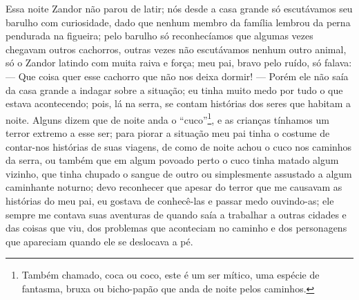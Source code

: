 Essa noite Zandor não parou de latir; nós desde a casa grande só escutávamos seu barulho com curiosidade, dado que nenhum membro da família lembrou da perna pendurada na figueira; pelo barulho só reconhecíamos que algumas vezes chegavam outros cachorros, outras vezes não escutávamos nenhum outro animal, só o Zandor latindo com muita raiva e força; meu pai, bravo pelo ruído, só falava: 
--- Que coisa quer esse cachorro que não nos deixa dormir! --- Porém ele não saía da casa grande a indagar sobre a situação; eu tinha muito medo por tudo o que estava acontecendo; pois, lá na serra, se contam histórias dos seres que habitam a noite. 
Alguns dizem que de noite anda o ``cuco''\footnote{Também chamado, coca ou coco, este é um ser mítico, uma espécie de fantasma, bruxa ou bicho-papão que anda de noite pelos caminhos.}, e as crianças tínhamos um terror extremo a esse ser; para piorar a situação meu pai tinha o costume de contar-nos histórias de suas viagens, de como de noite achou o cuco nos caminhos da serra, ou também que em algum povoado perto o cuco tinha matado algum vizinho, que tinha chupado o sangue de outro ou simplesmente assustado a algum caminhante noturno; devo reconhecer que apesar do terror que me causavam as histórias do meu pai, eu gostava de conhecê-las e passar medo ouvindo-as; ele sempre me contava suas aventuras de quando saía a trabalhar a outras cidades e das coisas que viu, dos problemas que aconteciam no caminho e dos personagens que apareciam quando ele se deslocava a pé.


